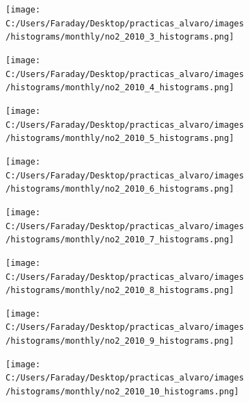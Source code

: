 \documentclass[12pt]{article}
\begin{document}
\begin{figure}[H]
\centering
\begin{subfigure}[h]{0.45\textwidth}
\texttt{[image: C:/Users/Faraday/Desktop/practicas\_alvaro/images/histograms/monthly/no2\_2010\_3\_histograms.png]}
\caption{}
\label{fig:hist-mon-1-3-2010}
\end{subfigure}
%
\begin{subfigure}[H]{0.45\textwidth}
\texttt{[image: C:/Users/Faraday/Desktop/practicas\_alvaro/images/histograms/monthly/no2\_2010\_4\_histograms.png]}
\caption{}
\label{fig:hist-mon-1-4-2010}
\end{subfigure}
\caption{}
\end{figure}

\begin{figure}[H]
\centering
\begin{subfigure}[h]{0.45\textwidth}
\texttt{[image: C:/Users/Faraday/Desktop/practicas\_alvaro/images/histograms/monthly/no2\_2010\_5\_histograms.png]}
\caption{}
\label{fig:hist-mon-1-5-2010}
\end{subfigure}
%
\begin{subfigure}[H]{0.45\textwidth}
\texttt{[image: C:/Users/Faraday/Desktop/practicas\_alvaro/images/histograms/monthly/no2\_2010\_6\_histograms.png]}
\caption{}
\label{fig:hist-mon-1-6-2010}
\end{subfigure}
\caption{}
\end{figure}

\newpage

\begin{figure}[H]
\centering
\begin{subfigure}[h]{0.45\textwidth}
\texttt{[image: C:/Users/Faraday/Desktop/practicas\_alvaro/images/histograms/monthly/no2\_2010\_7\_histograms.png]}
\caption{}
\label{fig:hist-mon-1-7-2010}
\end{subfigure}
%
\begin{subfigure}[H]{0.45\textwidth}
\texttt{[image: C:/Users/Faraday/Desktop/practicas\_alvaro/images/histograms/monthly/no2\_2010\_8\_histograms.png]}
\caption{}
\label{fig:hist-mon-1-8-2010}
\end{subfigure}
\caption{}
\end{figure}

\begin{figure}[H]
\centering
\begin{subfigure}[h]{0.45\textwidth}
\texttt{[image: C:/Users/Faraday/Desktop/practicas\_alvaro/images/histograms/monthly/no2\_2010\_9\_histograms.png]}
\caption{}
\label{fig:hist-mon-1-9-2010}
\end{subfigure}
%
\begin{subfigure}[H]{0.45\textwidth}
\texttt{[image: C:/Users/Faraday/Desktop/practicas\_alvaro/images/histograms/monthly/no2\_2010\_10\_histograms.png]}
\caption{}
\label{fig:hist-mon-1-10-2010}
\end{subfigure}
\caption{}
\end{figure}
\end{document}
